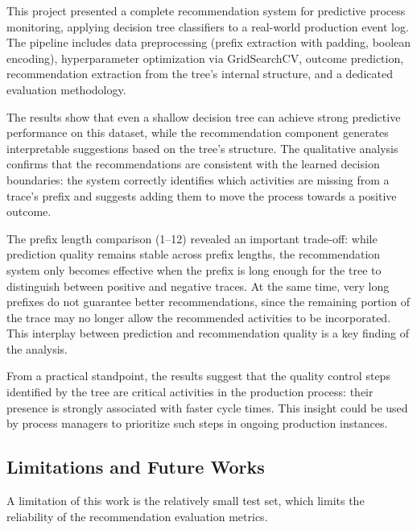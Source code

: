 \documentclass{article}
\begin{document}
This project presented a complete recommendation system for predictive process monitoring, applying decision tree classifiers to a real-world production event log. The pipeline includes data preprocessing (prefix extraction with padding, boolean encoding), hyperparameter optimization via GridSearchCV, outcome prediction, recommendation extraction from the tree's internal structure, and a dedicated evaluation methodology.

\medskip
\noindent
The results show that even a shallow decision tree can achieve strong predictive performance on this dataset, while the recommendation component generates interpretable suggestions based on the tree's structure. The qualitative analysis confirms that the recommendations are consistent with the learned decision boundaries: the system correctly identifies which activities are missing from a trace's prefix and suggests adding them to move the process towards a positive outcome.

\medskip
\noindent
The prefix length comparison (1--12) revealed an important trade-off: while prediction quality remains stable across prefix lengths, the recommendation system only becomes effective when the prefix is long enough for the tree to distinguish between positive and negative traces. At the same time, very long prefixes do not guarantee better recommendations, since the remaining portion of the trace may no longer allow the recommended activities to be incorporated. This interplay between prediction and recommendation quality is a key finding of the analysis.

\medskip
\noindent
From a practical standpoint, the results suggest that the quality control steps identified by the tree are critical activities in the production process: their presence is strongly associated with faster cycle times. This insight could be used by process managers to prioritize such steps in ongoing production instances.

\subsection{Limitations and Future Works}
A limitation of this work is the relatively small test set, which limits the reliability of the recommendation evaluation metrics.
\end{document}
